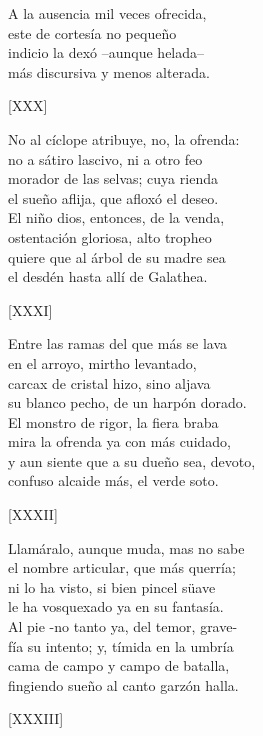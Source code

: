 \documentclass[11pt,a4paper,twoside]{article}
\begin{document}
A la ausencia mil veces ofrecida,\\
este de cortesía no pequeño\\
indicio la dexó --aunque  helada--\\
más discursiva y menos alterada.\pend
\begin{center}
	[XXX]
\end{center}\pstart
No al cíclope atribuye, no, la ofrenda:\\
no a sátiro lascivo, ni a otro feo\\
morador de las selvas; cuya rienda\\
el sueño aflija, que afloxó el deseo.\\
El niño dios, entonces, de la venda,\\
ostentación gloriosa, alto tropheo\\
quiere que al árbol de su madre sea\\
el desdén hasta allí de Galathea.\pend
\begin{center}
	[XXXI]
\end{center}\pstart
Entre las ramas del que más se lava\\
en el arroyo, mirtho levantado,\\
carcax de cristal hizo, sino aljava\\
su blanco pecho, de un harpón dorado.\\
El monstro de rigor, la fiera braba\\
mira la ofrenda ya con más cuidado,\\
y aun siente que a su dueño sea, devoto,\\
confuso alcaide más, el verde soto.\pend
\begin{center}
	[XXXII]
\end{center}\pstart
Llamáralo, aunque muda, mas no sabe\\
el nombre articular, que más querría;\\
ni lo ha visto, si bien pincel süave\\
le ha vosquexado ya en su fantasía.\\
Al pie -no tanto ya, del temor, grave-\\
fía su intento; y, tímida en la umbría\\
cama de campo y campo de batalla,\\
fingiendo sueño al canto garzón halla.\pend
\begin{center}
	[XXXIII]
\end{center}\pstart
\end{document}
